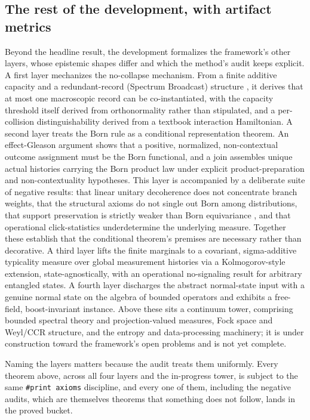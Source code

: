 \documentclass[11pt]{article}
\begin{document}
\subsection{The rest of the development, with artifact metrics}

Beyond the headline result, the development formalizes the framework's other layers, whose epistemic
shapes differ and which the method's audit keeps explicit. A
first layer mechanizes the no-collapse mechanism. From a finite additive capacity and a
redundant-record (Spectrum Broadcast) structure \cite{r45}, it derives that at most one macroscopic record can
be co-instantiated, with the capacity threshold itself derived from orthonormality rather than
stipulated, and a per-collision distinguishability derived from a textbook interaction Hamiltonian.
A second layer treats the Born rule as a conditional representation theorem. An effect-Gleason
argument \cite{r35,r36} shows that a positive, normalized, non-contextual outcome assignment must be the Born
functional, and a join assembles unique actual histories carrying the Born product law under
explicit product-preparation and non-contextuality hypotheses. This layer is accompanied by a
deliberate suite of negative results: that linear unitary decoherence does not concentrate branch
weights, that the structural axioms do not single out Born among distributions, that support
preservation is strictly weaker than Born equivariance \cite{r37}, and that operational click-statistics
underdetermine the underlying measure. Together these establish that the conditional theorem's
premises are necessary rather than decorative. A third layer lifts the finite marginals to a
covariant, sigma-additive typicality measure over global measurement histories via a
Kolmogorov-style extension, state-agnostically, with an operational no-signaling result for
arbitrary entangled states. A fourth layer discharges the abstract normal-state input with a
genuine normal state on the algebra of bounded operators and exhibits a free-field, boost-invariant
instance. Above these sits a continuum tower, comprising bounded spectral theory and
projection-valued measures, Fock space and Weyl/CCR structure, and the entropy and data-processing
machinery; it is under construction toward the framework's open problems and is not yet complete.

Naming the layers matters because the audit treats them uniformly. Every theorem above, across all
four layers and the in-progress tower, is subject to the same \texttt{\#print axioms} discipline, and every
one of them, including the negative audits, which are themselves theorems that something does not
follow, lands in the proved bucket.
\end{document}

